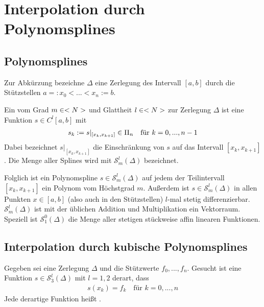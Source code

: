 \section{Interpolation durch Polynomsplines}

\subsection{Polynomsplines}

Zur Abkürzung bezeichne $\Delta$ eine Zerlegung des Intervall $[a,b]$ durch die Stützstellen $a=:x_0<...<x_n:=b$.

\begin{definition}[Polynomspline]
	Ein  vom Grad $m\in<N>$ und Glattheit $l\in<N>$ zur Zerlegung $\Delta$ ist eine Funktion $s\in C^l[a,b]$ mit
	\begin{align}
		s_k := s\vert_{[x_k,x_{k+1}]}\in\Pi_n\quad\text{für } k=0,...,n-1\notag
	\end{align}
	Dabei bezeichnet $s\vert_{[x_k,x_{k+1}]}$ die Einschränkung von $s$ auf das Intervall $[x_k,x_{k+1}]$. Die Menge aller Splines wird mit $\mathcal{S}^l_m(\Delta)$ bezeichnet.
	
	Folglich ist ein Polynomspline $s\in\mathcal{S}^l_m(\Delta)$ auf jedem der Teilintervall $[x_k,x_{k+1}]$ ein Polynom vom Höchstgrad $m$. Außerdem ist $s\in\mathcal{S}^l_m(\Delta)$ in allen Punkten $x\in[a,b]$ (also auch in den Stützstellen) $l$-mal stetig differenzierbar. $\mathcal{S}^l_m(\Delta)$ ist mit der üblichen Addition und Multiplikation ein Vektorraum. Speziell ist $\mathcal{S}^0_1(\Delta)$ die Menge aller stetigen stückweise affin linearen Funktionen.
\end{definition}

\subsection{Interpolation durch kubische Polynomsplines}

Gegeben sei eine Zerlegung $\Delta$ und die Stützwerte $f_0,...,f_n$. Gesucht ist eine Funktion $s\in\mathcal{S}^l_3(\Delta)$ mit $l=1,2$ derart, dass
\begin{align}
	\label{1.6}
	s(x_k)=f_k\quad\text{für } k=0,...,n
\end{align}
Jede derartige Funktion heißt .

